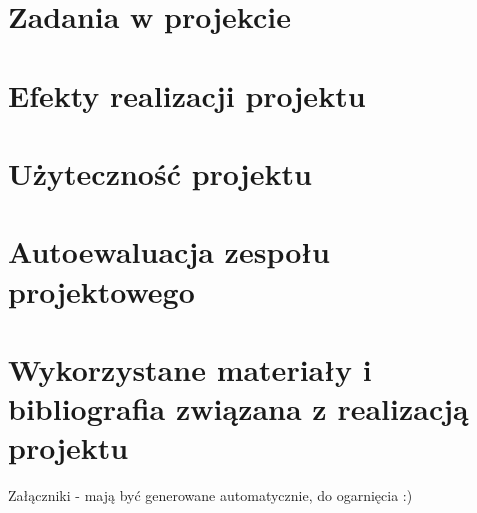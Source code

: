 \documentclass[12pt, oneside, a4paper]{book}
\begin{document}
\section{Zadania w projekcie}

\section{Efekty realizacji projektu}

\section{Użyteczność projektu}

\section{Autoewaluacja zespołu projektowego}

\section{Wykorzystane materiały i bibliografia związana z realizacją projektu}

Załączniki - mają być generowane automatycznie, do ogarnięcia :)
\end{document}
